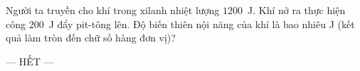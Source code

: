 	\begin{ex}%
		Người ta truyền cho khí trong xilanh nhiệt lượng $1200$~J. Khí nở ra thực hiện công $200$~J đẩy pit-tông lên. Độ biến thiên nội năng của khí là bao nhiêu J (kết quả làm tròn đến chữ số hàng đơn vị)?
		\par
	\end{ex}

	\centerline{--- HẾT ---}


